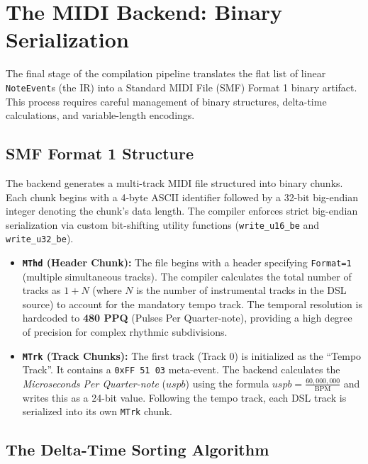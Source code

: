 \section{The MIDI Backend: Binary Serialization}\label{sec:implementation-backend}

The final stage of the compilation pipeline translates the flat list of linear \texttt{NoteEvent}s (the IR) into a
Standard MIDI File (SMF) Format 1 binary artifact.
This process requires careful management of binary structures, delta-time calculations, and variable-length encodings.

\subsection{SMF Format 1 Structure}\label{subsec:smf-format-1-structure}

The backend generates a multi-track MIDI file structured into binary chunks.
Each chunk begins with a 4-byte ASCII identifier followed by a 32-bit big-endian integer denoting the chunk's data
length.
The compiler enforces strict big-endian serialization via custom bit-shifting utility functions (\texttt{write\_u16\_be}
and \texttt{write\_u32\_be}).

\begin{itemize}
  \item \textbf{\texttt{MThd} (Header Chunk):} The file begins with a header specifying \texttt{Format=1}
    (multiple simultaneous tracks).
    The compiler calculates the total number of tracks as $1 + N$ (where $N$ is the number of instrumental tracks in the
    DSL source) to account for the mandatory tempo track.
    The temporal resolution is hardcoded to \textbf{480 PPQ} (Pulses Per Quarter-note), providing a high degree of
    precision for complex rhythmic subdivisions.
  \item \textbf{\texttt{MTrk} (Track Chunks):} The first track (Track 0) is initialized as the ``Tempo Track''.
    It contains a \texttt{0xFF 51 03} meta-event.
    The backend calculates the \textit{Microseconds Per Quarter-note} ($uspb$) using the formula $uspb =
    \frac{60,000,000}{\mathrm{BPM}}$ and writes this as a 24-bit value.
    Following the tempo track, each DSL track is serialized into its own \texttt{MTrk} chunk.
\end{itemize}

\subsection{The Delta-Time Sorting Algorithm}\label{subsec:the-delta-time-sorting-algorithm}

